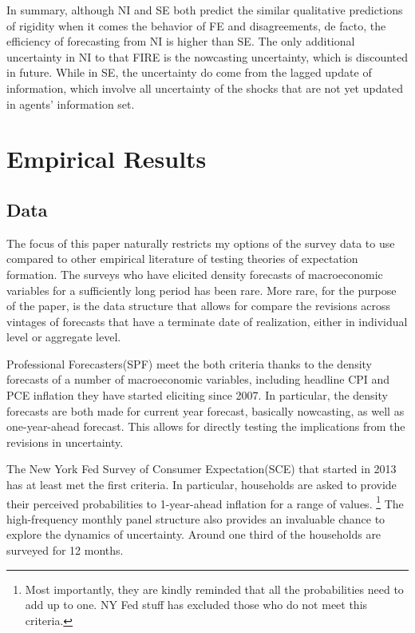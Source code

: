 \documentclass[]{article}
\begin{document}
	In summary, although NI and SE both predict the similar qualitative predictions of rigidity when it comes the behavior of FE and disagreements, de facto, the efficiency of forecasting from NI is higher than SE. The only additional uncertainty in NI to that FIRE is the nowcasting uncertainty, which is discounted in future. While in SE, the uncertainty do come from the lagged update of information, which involve all uncertainty of the shocks that are not yet updated in agents' information set. 
	
	\section{Empirical Results}\label{empirical}
	
	\subsection{Data}
	
	The focus of this paper naturally restricts my options of the survey data to use compared to other empirical  literature of testing theories of expectation formation.  The surveys who have elicited density forecasts of macroeconomic variables for a sufficiently long period has been rare. More rare, for the purpose of the paper, is the data structure that allows for compare the revisions across vintages of forecasts that have a terminate date of realization, either in individual level or aggregate level. 
	
	Professional Forecasters(SPF)  meet the both criteria thanks to the density forecasts of a number of macroeconomic variables, including headline CPI and PCE inflation they have started eliciting since 2007. In particular, the density forecasts are both made for current year forecast, basically nowcasting, as well as one-year-ahead forecast. This allows for directly testing the implications from the revisions in uncertainty.  
	
	The New York Fed Survey of Consumer Expectation(SCE) that started in 2013 has at least met the first criteria. In particular, households are asked to provide their perceived probabilities to 1-year-ahead inflation for a range of values. \footnote{Most importantly, they are kindly reminded that all the probabilities need to add up to one. NY Fed stuff has excluded those who do not meet this criteria.} The high-frequency monthly panel structure also provides an invaluable chance to explore the dynamics of uncertainty. Around one third of the households are surveyed for 12 months.  
	
\end{document}
